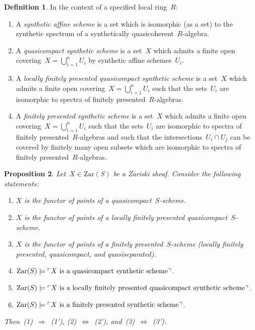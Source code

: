 \documentclass[10pt,reqno,a4paper]{amsbook}
\theoremstyle{definition}
\newtheorem{defn}{Definition}[section]
\theoremstyle{plain}
\newtheorem{prop}[defn]{Proposition}
\theoremstyle{remark}
\newcommand{\Zar}{\mathrm{Zar}}
\newcommand{\?}{\,{:}\,}
\renewcommand{\_}{\mathpunct{.}\,}
\newcommand{\speak}[1]{\ulcorner\text{\textnormal{#1}}\urcorner}
\begin{document}
\begin{defn}\label{defn:synthetic-scheme}
In the context of a specified local ring~$R$:
\begin{enumerate}
\item A \emph{synthetic affine scheme} is a set which is isomorphic (as a set)
to the synthetic spectrum of a synthetically
quasicoherent~$R$-algebra.
\item A \emph{quasicompact synthetic scheme} is a set~$X$ which admits a finite
open covering~$X = \bigcup_{i=1}^n U_i$ by synthetic affine schemes~$U_i$.
\item A \emph{locally finitely presented quasicompact synthetic scheme} is a
set~$X$ which admits a finite open covering~$X = \bigcup_{i=1}^n U_i$ such that
the sets~$U_i$ are isomorphic to spectra of finitely presented~$R$-algebras.
\item A \emph{finitely presented synthetic scheme} is a set~$X$ which admits a
finite open covering~$X = \bigcup_{i=1}^n U_i$ such that the sets~$U_i$ are
isomorphic to spectra of finitely presented~$R$-algebras and such that the
intersections~$U_i \cap U_j$ can be covered by finitely many open subsets which
are isomorphic to spectra of finitely presented~$R$-algebras.
\end{enumerate}
\end{defn}

\begin{prop}Let~$X \in \Zar(S)$ be a Zariski sheaf. Consider the following
statements:
\begin{enumerate}
\item $X$ is the functor of points of a quasicompact~$S$-scheme.
\item $X$ is the functor of points of a locally finitely presented quasicompact~$S$-scheme.
\item $X$ is the functor of points of a finitely presented~$S$-scheme (locally
finitely presented, quasicompact, and quasiseparated).
\item[(1')] $\Zar(S) \models \speak{$X$ is a quasicompact synthetic scheme}$.
\item[(2')] $\Zar(S) \models \speak{$X$ is a locally finitely presented quasicompact synthetic scheme}$.
\item[(3')] $\Zar(S) \models \speak{$X$ is a finitely presented synthetic scheme}$.
\end{enumerate}
Then~(1)~$\Rightarrow$~(1'), (2)~$\Leftrightarrow$~(2'),
and~(3)~$\Leftrightarrow$~(3').
\end{prop}
\end{document}
